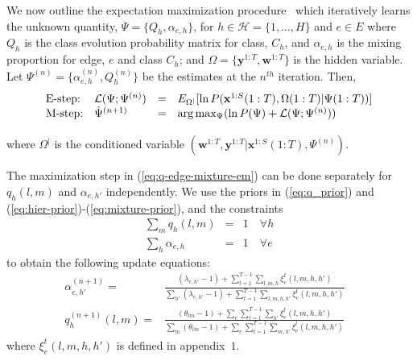 \documentclass{bioinfo}
\begin{document}
\begin{methods}
We now outline the expectation maximization procedure~\citep{Dempster77em} which
iteratively learns the unknown quantity, $\Psi = \{Q_{h},
\alpha_{e,h}\}$, for $h \in {\mathcal H} = \{1,\ldots, H\}$ and $e \in
E$ where  $Q_{h}$ is the class evolution
probability matrix for class, $C_h$, and $\alpha_{e,h}$ is the mixing
proportion for  edge, $e$ and class $C_h$; and $\Omega =
\{\mathbf{y}^{1:T},\mathbf{w}^{1:T}\}$ is
the hidden variable.  Let $\Psi^{(n)} = \{\alpha^{(n)}_{e,h},
Q^{(n)}_h\}$ be the estimates at the $n^{th}$ iteration. Then, 
\begin{equation}
  \label{eq:q-edge-mixture-em}
  \begin{array}[h]{llll}
  \textrm{E-step:} & {\mathcal L}(\Psi; \Psi^{(n)}) &=&
  E_{\Omega^{|} }  [ \ln P(\mathbf{x}^{1:S}(1:T), \Omega({1:T}) | \Psi({1:T}))] \\
\vspace{2 mm}
  \textrm{M-step:} & \hat{\Psi}^{(n+1)} &=& \arg\max_{\Psi} (\ln P(\Psi) +
  {\mathcal L}(\Psi; \Psi^{(n)} ) ) 
  \end{array}
\end{equation}
where $\Omega^{|}$ is the conditioned variable $(\mathbf{w}^{1:T},
\mathbf{y}^{1:T} | \mathbf{x}^{1:S}(1:T),  \Psi^{(n)})$.

The maximization step in (\ref{eq:q-edge-mixture-em}) can  be done
separately for $q_h(l,m)$ and $\alpha_{e,h'}$ independently. We use
the priors in (\ref{eq:q_prior}) and
(\ref{eq:hier-prior})-(\ref{eq:mixture-prior}), and the constraints
\begin{eqnarray}
  \label{eq:mixture-q-constraint-0} \sum_{m} q_h(l,m) &=& 1 \quad\forall h \\
   \label{eq:mixture-alpha-constraint-0} \sum_{h} \alpha_{e,h} &=& 1 \quad\forall e
\end{eqnarray}
to obtain the following update equations:
\begin{eqnarray}
  \label{eq:mixture-alpha-update}
  \alpha_{e,h'}^{(n+1)} =&  \frac{(\lambda_{e,h'}-1) + \sum_{t=1}^{T-1} \sum_{l,m,h}\xi^{t}_{e}(l,
    m,h,h') }{\sum_{h'} (\lambda_{e,h'} -1) + \sum^{T-1}_{t=1}
    \sum_{l,m,h,h'} \xi^{t}_{e}(l,m,h,h')} & \\
\label{eq:mixture-q-update} 
q^{(n+1)}_h(l,m) =&  \frac{(\theta_{lm}-1) + \sum_e \sum_{t=1}^{T-1}\sum_{h'}\xi^{t}_{e}(l,
    m,h,h') }{\sum_{m} (\theta_{lm} -1) + \sum_e \sum^{T-1}_{t=1}
    \sum_{m,h'} \xi^{t}_{e}(l,m,h,h')} &
\end{eqnarray}
where $\xi^{t}_{e}(l,m,h,h')$ is defined in
appendix~$1$.%


\end{methods}
\end{document}
